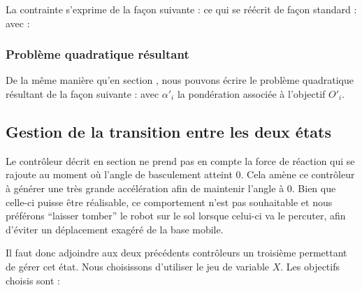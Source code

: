 					La contrainte s'exprime de la façon suivante :
					ce qui se réécrit de façon standard :
					avec :

			\subsubsection{Problème quadratique résultant}
		
				De la même manière qu'en section , nous pouvons écrire le problème quadratique résultant de la façon suivante :
				avec $\alpha'_i$ la pondération associée à l'objectif $O'_i$.

		\subsection{Gestion de la transition entre les deux états}
		\label{section.mpc_transition}
		
			Le contrôleur décrit en section  ne prend pas en compte la force de réaction qui se rajoute au moment où l'angle de basculement atteint $0$.
			Cela amène ce contrôleur à générer une très grande accélération afin de maintenir l'angle à $0$. 
			Bien que celle-ci puisse être réalisable, ce comportement n'est pas souhaitable et nous préférons ``laisser tomber'' le robot sur le sol lorsque celui-ci va le percuter, afin d'éviter un déplacement exagéré de la base mobile.
			
			Il faut donc adjoindre aux deux précédents contrôleurs un troisième permettant de gérer cet état. Nous choisissons d'utiliser le jeu de variable $X$.
			Les objectifs choisis sont :
			
